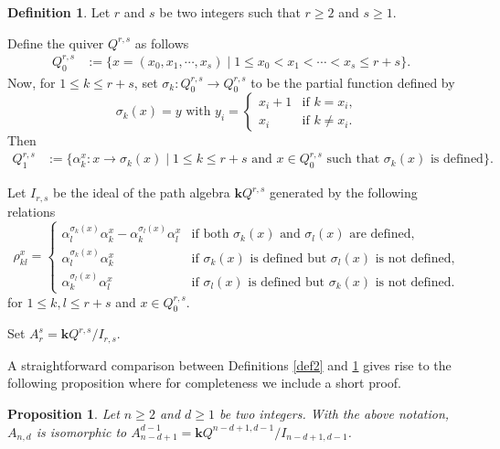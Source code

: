 \documentclass{amsart}
\newcommand{\bk}{\mathbf{k}}
\theoremstyle{plain}
\newtheorem{Prop}[Thm]{Proposition}
\theoremstyle{definition}
\newtheorem{Def}[Thm]{Definition}
\numberwithin{equation}{section}
\begin{document}
\begin{Def}\label{def3}
    Let $r$ and $s$ be two integers such that $r\ge 2$ and $s\ge 1$. 

Define the quiver $Q^{r,s}$ as follows \begin{align*}
        Q^{r,s}_0 & :=\{x=(x_0,x_1,\cdots,x_s)\mid 1\le x_0<x_1<\cdots<x_s\le r+s \}.\quad \end{align*}
Now, for $1\leq k \leq r+s$, set $\sigma_k: Q_0^{r,s} \to Q_0^{r,s}$ to be the partial function defined by 
    \[\sigma_k(x)=y \text{\ with\ } y_i=\begin{cases}
        x_i+1 & \text{if $k=x_i$},\\ x_i & \text{if $k\neq x_i$}.
    \end{cases}\]
Then    \begin{align*} Q^{r,s}_1 & :=\{\alpha_k^x:x\to \sigma_k(x)\mid 1\le k\le r+s \text{ and } x\in Q^{r,s}_0 \text{ such that } \sigma_k(x) \text{ is defined} \}.
    \end{align*} 

     Let $I_{r,s}$ be the ideal of the path algebra $\bk Q^{r,s}$ generated by the following relations 
    \[\rho_{kl}^x=\begin{cases}
        \alpha_l^{\sigma_k(x)}\alpha_k^x-\alpha_k^{\sigma_l(x)}\alpha_l^x & \text{if both $\sigma_k(x)$ and $\sigma_l(x)$ are defined}, \\ \alpha_l^{\sigma_k(x)}\alpha_k^x & \text{if $\sigma_k(x)$ is defined but $\sigma_l(x)$ is not defined}, \\ \alpha_k^{\sigma_l(x)}\alpha_l^x & \text{if $\sigma_l(x)$ is defined but $\sigma_k(x)$ is not defined}.
    \end{cases}\] for $1\le k,l\le r+s$ and $x\in Q_0^{r,s}$.
    
    \medskip
    
     Set  $A_r^s = \bk Q^{r,s}/I_{r,s}$.
\end{Def}

A straightforward comparison between Definitions \ref{def2} and \ref{def3} gives rise to the following proposition where for completeness we include a short proof. 
\begin{Prop}\label{def-equ}\label{prop:equ-def}
    Let $n\ge 2$ and $d\ge 1$ be two integers. With the above notation,  $A_{n,d}$ is isomorphic to $A_{n-d+1}^{d-1}=\bk Q^{n-d+1,d-1}/I_{n-d+1,d-1}$. 
\end{Prop}
\end{document}
